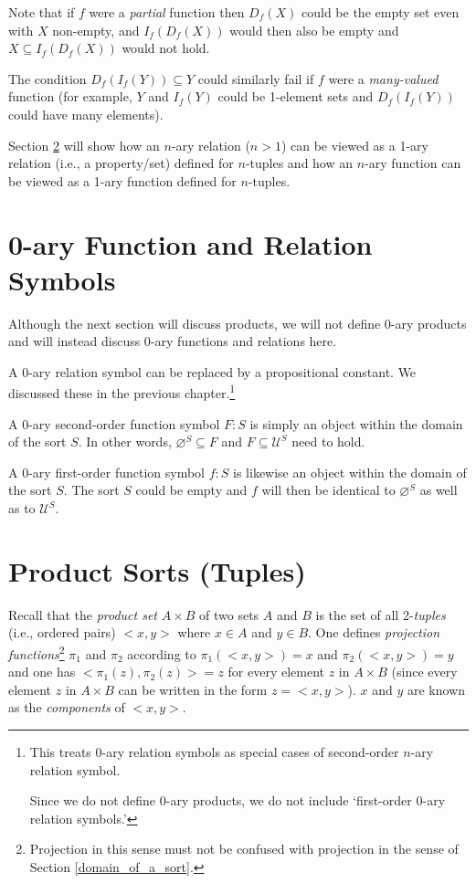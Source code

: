 \documentclass[12pt]{book}
\begin{document}
Note that if $f$ were a \textit{partial} function then $D_f(X)$ could be the empty set even with $X$ non-empty, and $I_f(D_f(X))$ would then also be empty and $X \subseteq I_f(D_f(X))$ would not hold.

The condition $D_f(I_f(Y)) \subseteq Y$ could similarly fail if $f$ were a \textit{many-valued} function (for example, $Y$ and $I_f(Y)$ could be 1-element sets and $D_f(I_f(Y))$ could have many elements).

Section \ref{product_sorts} will show how an $n$-ary relation ($n > 1$) can be viewed as a 1-ary relation (i.e., a property/set) defined for $n$-tuples and how an $n$-ary function can be viewed as a 1-ary function defined for $n$-tuples.

\section{0-ary Function and Relation Symbols} \label{0ary_functions_and_relations}
Although the next section will discuss products, we will not define 0-ary products and will instead discuss 0-ary functions and relations here. 

A $0$-ary relation symbol can be replaced by a propositional constant. We discussed these in the previous chapter.\footnote{This treats $0$-ary relation symbols as special cases of second-order $n$-ary relation symbol. 
    
Since we do not define 0-ary products, we do not include  `first-order $0$-ary relation symbols.'}

A $0$-ary second-order function symbol $F: S$ is simply an object within the domain of the sort $S$. In other words, $\varnothing^S \subseteq F$ and $F \subseteq \mathcal{U}^S$ need to hold.

A $0$-ary first-order function symbol $f: S$ is likewise an object within the domain of the sort $S$. The sort $S$ could be empty and $f$ will then be identical to $\varnothing^S$ as well as to $\mathcal{U}^S$.

\section{Product Sorts (Tuples)} \label{product_sorts}
Recall that the \textit{product set} $A \times B$ of two sets $A$ and $B$ is the set of all 2-\textit{tuples} (i.e., ordered pairs) $<x, y>$ where $x \in A$ and $y \in B$. One defines \textit{projection functions}\footnote{Projection in this sense must not be confused with projection in the sense of Section \ref{domain_of_a_sort}.} $\pi_1$ and $\pi_2$ according to $\pi_1(<x, y>) = x$ and $\pi_2(<x, y>) = y$ and one has $<\pi_1(z), \pi_2(z)> = z$ for every element $z$ in $A \times B$ (since every element $z$ in $A \times B$ can be written in the form $z = <x, y>$). $x$ and $y$ are known as the \textit{components} of $<x, y>$.
\end{document}
